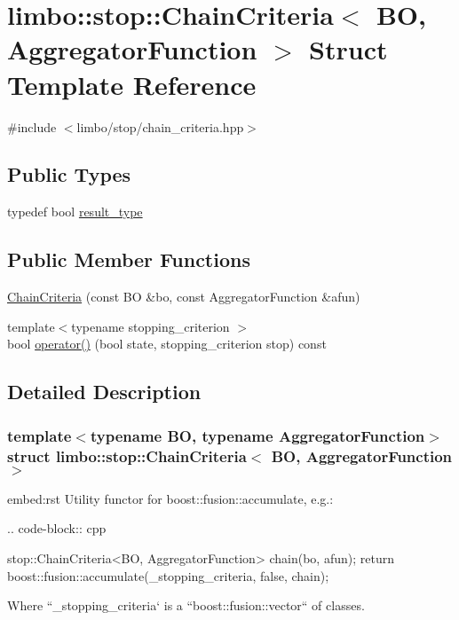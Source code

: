 \hypertarget{structlimbo_1_1stop_1_1_chain_criteria}{}\section{limbo\+:\+:stop\+:\+:Chain\+Criteria$<$ B\+O, Aggregator\+Function $>$ Struct Template Reference}
\label{structlimbo_1_1stop_1_1_chain_criteria}


{\ttfamily \#include $<$limbo/stop/chain\+\_\+criteria.\+hpp$>$}

\subsection*{Public Types}
\begin{DoxyCompactItemize}
\item 
typedef bool \hyperlink{structlimbo_1_1stop_1_1_chain_criteria_a2b3c7f6d2309ff6dd4e67fb28302a7e4}{result\+\_\+type}
\end{DoxyCompactItemize}
\subsection*{Public Member Functions}
\begin{DoxyCompactItemize}
\item 
\hyperlink{structlimbo_1_1stop_1_1_chain_criteria_a287a286866f5ddc83432f23dc1c7c63d}{Chain\+Criteria} (const B\+O \&bo, const Aggregator\+Function \&afun)
\item 
{\footnotesize template$<$typename stopping\+\_\+criterion $>$ }\\bool \hyperlink{structlimbo_1_1stop_1_1_chain_criteria_a1d95f89ebcc61121482a372d37c3a62f}{operator()} (bool state, stopping\+\_\+criterion stop) const 
\end{DoxyCompactItemize}


\subsection{Detailed Description}
\subsubsection*{template$<$typename B\+O, typename Aggregator\+Function$>$struct limbo\+::stop\+::\+Chain\+Criteria$<$ B\+O, Aggregator\+Function $>$}

\begin{DoxyVerb}embed:rst
Utility functor for boost::fusion::accumulate, e.g.:

.. code-block:: cpp

  stop::ChainCriteria<BO, AggregatorFunction> chain(bo, afun);
  return boost::fusion::accumulate(_stopping_criteria, false, chain);

Where ``_stopping_criteria` is a ``boost::fusion::vector`` of classes.\end{DoxyVerb}
 

